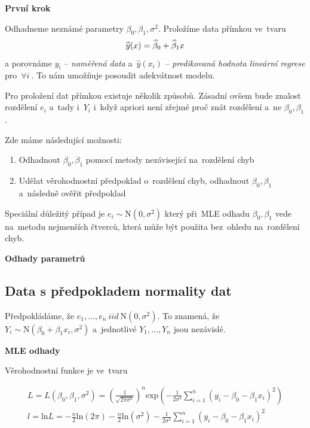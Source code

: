 \textbf{První krok }

Odhadneme neznámé parametry $ \beta_{0}, \beta_{1}, \sigma^{2} $. Proložíme data přímkou ve~tvaru
$$
	\widehat{y}(x) = \widehat{\beta}_{0} + \widehat{\beta}_{1} x 
$$
a porovnáme $ y_{i} $ -- \textit{naměřená data} a~$ \widehat{y}(x_{i}) $ -- \textit{predikovaná hodnota lineární regrese} pro~$ \forall i~$. To nám umožňuje posoudit adekvátnost modelu.

Pro proložení dat přímkou existuje několik způsobů. Zásadní ovšem bude znalost rozdělení $ e_{i} $ a~tady i~$ Y_{i} $ i~když apriori není zřejmé proč znát rozdělení a~ne $ \beta_{0}, \beta_{1} $.

Zde máme následující možnosti:

\begin{enumerate}
  \item Odhadnout $ \beta_{0} , \beta_{1} $ pomocí metody nezávisející na~rozdělení chyb
  \item Udělat věrohodnostní předpoklad o~rozdělení chyb, odhadnout $ \beta_{0} , \beta_{1} $ a~následně ověřit předpoklad
\end{enumerate}


\begin{remark}
 Speciální důležitý případ je $ e_{i} \sim \text{N}(0,\sigma^{2}) $ který při~MLE odhadu $ \beta_{0}, \beta_{1} $ vede na~metodu nejmenších čtverců, která může být použita bez~ohledu na~rozdělení chyb.
\end{remark}

\textbf{Odhady parametrů}
\subsection{Data s předpokladem normality dat}
Předpokládáme, že $ e_{1}, \dots , e_{n} ~iid~ \text{N}(0,\sigma^{2}) $. To znamená, že $ Y_{i} \sim \text{N}(\beta_{0} + \beta_{1} x_{i},\sigma^{2}) $ a~jednotlivé $ Y_{1}, \dots , Y_{n} $ jsou nezávislé.

\textbf{MLE odhady}

Věrohodnostní funkce je ve~tvaru

$$
\begin{aligned}
	L = L ( \beta_{0} , \beta_{1} , \sigma^{2} ) = \left( \frac{1}{ \sqrt{ 2 \pi \sigma^{2} }} \right) ^{n} \text{exp} \left( - \frac{1}{2 \sigma^{2} } \sum_{i = 1}^{n}( y_{i} -  \beta_{0}  - \beta_{1} x_{i} )^{2} \right) \\
l = \text{ln} L = -\frac{n}{2} \text{ln} ( 2 \pi ) -\frac{n}{2} \text{ln} (\sigma^{2} ) - \frac{1}{2 \sigma^{2} } \sum_{i = 1}^{n}( y_{i} -  \beta_{0}  - \beta_{1} x_{i})^{2}
\end{aligned}
$$

